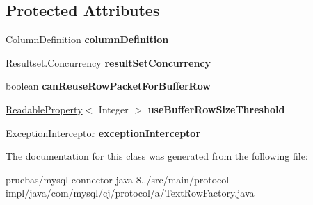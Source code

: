 \subsection*{Protected Attributes}
\begin{DoxyCompactItemize}
\item 
\mbox{\label{classcom_1_1mysql_1_1cj_1_1protocol_1_1a_1_1_text_row_factory_a723ac4ba54ca214d91299abaa333693e}} 
\mbox{\hyperlink{interfacecom_1_1mysql_1_1cj_1_1protocol_1_1_column_definition}{Column\+Definition}} {\bfseries column\+Definition}
\item 
\mbox{\label{classcom_1_1mysql_1_1cj_1_1protocol_1_1a_1_1_text_row_factory_a7bf45e9680bd7908c812398a3206c79d}} 
Resultset.\+Concurrency {\bfseries result\+Set\+Concurrency}
\item 
\mbox{\label{classcom_1_1mysql_1_1cj_1_1protocol_1_1a_1_1_text_row_factory_ad1c4d5c8f2bab424674be72ed7a4bb21}} 
boolean {\bfseries can\+Reuse\+Row\+Packet\+For\+Buffer\+Row}
\item 
\mbox{\label{classcom_1_1mysql_1_1cj_1_1protocol_1_1a_1_1_text_row_factory_a71885b432fc6c0822fc2ba168fb4977a}} 
\mbox{\hyperlink{interfacecom_1_1mysql_1_1cj_1_1conf_1_1_readable_property}{Readable\+Property}}$<$ Integer $>$ {\bfseries use\+Buffer\+Row\+Size\+Threshold}
\item 
\mbox{\label{classcom_1_1mysql_1_1cj_1_1protocol_1_1a_1_1_text_row_factory_a946b99bee4caa665f11a74d7a21af42b}} 
\mbox{\hyperlink{interfacecom_1_1mysql_1_1cj_1_1exceptions_1_1_exception_interceptor}{Exception\+Interceptor}} {\bfseries exception\+Interceptor}
\end{DoxyCompactItemize}


The documentation for this class was generated from the following file\+:\begin{DoxyCompactItemize}
\item 
pruebas/mysql-\/connector-\/java-\/8../src/main/protocol-\/impl/java/com/mysql/cj/protocol/a/Text\+Row\+Factory.\+java\end{DoxyCompactItemize}
